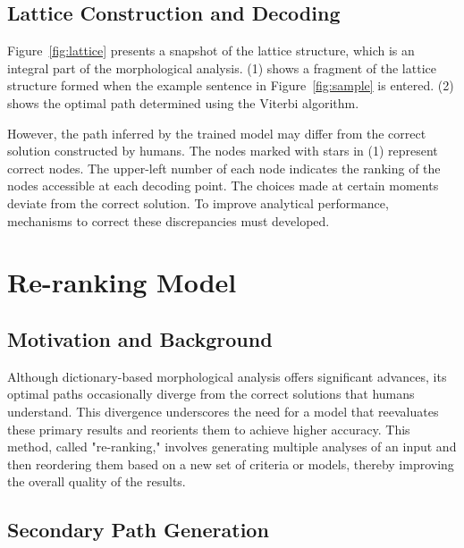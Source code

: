 \documentclass[AMS,STIX2COL]{WileyNJD-v2}
\begin{document}
    \subsection{Lattice Construction and Decoding}\label{subsec3.3}

    Figure~\ref{fig:lattice} presents a snapshot of the lattice structure, which is an integral part of the morphological analysis.
    (1) shows a fragment of the lattice structure formed when the example sentence in Figure~\ref{fig:sample} is entered.
    (2) shows the optimal path determined using the Viterbi algorithm.

    However, the path inferred by the trained model may differ from the correct solution constructed by humans.
    The nodes marked with stars in (1) represent correct nodes.
    The upper-left number of each node indicates the ranking of the nodes accessible at each decoding point.
    The choices made at certain moments deviate from the correct solution.
    To improve analytical performance, mechanisms to correct these discrepancies must developed.


    \section{Re-ranking Model}\label{sec:re-ranking-model}

    \subsection{Motivation and Background}\label{subsec4.1}

    Although dictionary-based morphological analysis offers significant advances, its optimal paths occasionally diverge from the correct solutions that humans understand.
    This divergence underscores the need for a model that reevaluates these primary results and reorients them to achieve higher accuracy.
    This method, called "re-ranking," involves generating multiple analyses of an input and then reordering them based on a new set of criteria or models, thereby improving the overall quality of the results.

    \subsection{Secondary Path Generation}\label{subsec4.2}
\end{document}
